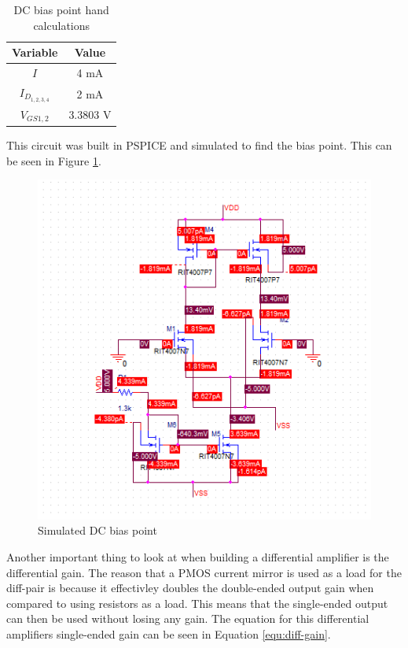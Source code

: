 \documentclass[11pt]{article}
\begin{document}
	\begin{table}[H]
		\centering
		\caption{DC bias point hand calculations}
		\label{table:qpoint}
		\begin{tabular}{|c|c|}
			\hline
			\textbf{Variable} & \textbf{Value}\\
			\hline
			$I$ & 4 $\si{\milli\ampere}$\\
			\hline
			$I_{D_{1,2,3,4}}$ & 2 $\si{\milli\ampere}$\\
			\hline
			$V_{GS1,2}$ & 3.3803 $\si{\volt}$\\
			\hline
		\end{tabular}
	\end{table}

	This circuit was built in PSPICE and simulated to find the bias point.
	This can be seen in Figure \ref{fig:qpoint}.

	\begin{figure}[H]
		\centering
		\includegraphics[width=4.5 in]{qpoint.png}
		\caption{Simulated DC bias point}
		\label{fig:qpoint}
	\end{figure}
	
	
	Another important thing to look at when building a differential amplifier is
	the differential gain. The reason that a PMOS current mirror is used as a 
	load for the diff-pair is because it effectivley doubles the double-ended 
	output gain when compared to using resistors as a load. This means that 
	the single-ended output can then be used without losing any gain. The 
	equation for this differential amplifiers single-ended gain can be seen 
	in Equation \ref{equ:diff-gain}.
\end{document}
